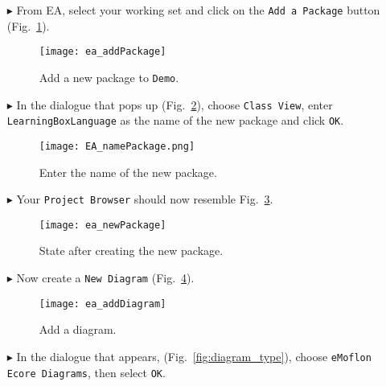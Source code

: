 \begin{itemize}

\item[$\blacktriangleright$] From EA, select your working set and click on the \texttt{Add a Package} button (Fig.~\ref{fig:new_package}).

\begin{figure}[htbp]
	\centering
  \texttt{[image: ea\_addPackage]}
	\caption{Add a new package to \texttt{Demo}.}
	\label{fig:new_package}
\end{figure}

\item[$\blacktriangleright$] In the dialogue that pops up (Fig.~\ref{fig:new_package_name}), choose \texttt{Class View}, enter \texttt{Learning\-Box\-Language}
as the name of the new package and click \texttt{OK}.

\begin{figure}[htbp]
	\centering
    \texttt{[image: EA\_namePackage.png]}
	\caption{Enter the name of the new package.}
	\label{fig:new_package_name}
\end{figure}
\FloatBarrier


\vspace{0.5cm}
\item[$\blacktriangleright$] Your \texttt{Project Browser} should now resemble Fig.~\ref{fig:new_package_completed}.

\begin{figure}[htbp]
	\centering
  \texttt{[image: ea\_newPackage]}
	\caption{State after creating the new package.}
	\label{fig:new_package_completed}
\end{figure}
\FloatBarrier



\item[$\blacktriangleright$] Now create a \texttt{New Diagram} (Fig.~\ref{fig:diagram}).

\vspace{0.5cm}

\begin{figure}[htbp]
	\centering
  \texttt{[image: ea\_addDiagram]}
	\caption{Add a diagram.}
	\label{fig:diagram}
\end{figure}
\FloatBarrier



\item[$\blacktriangleright$] In the dialogue that appears, (Fig.~\ref{fig:diagram_type}), choose \texttt{eMoflon Ecore Diagrams}, then select \texttt{OK}.

\end{itemize}


